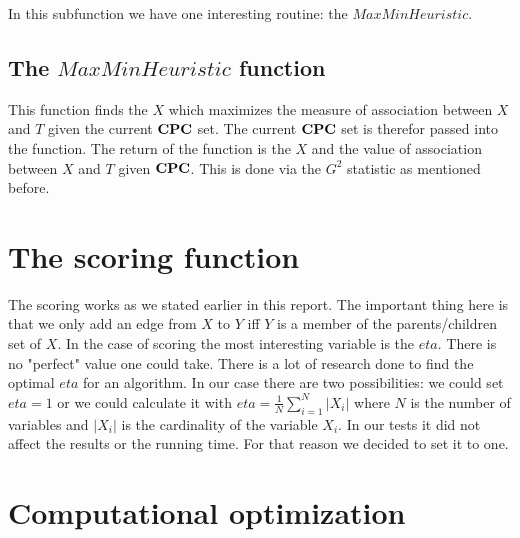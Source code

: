 			 \label{img.mmpcBar}

			In this subfunction we have one interesting routine: the $MaxMinHeuristic$.

			\subsection{The $MaxMinHeuristic$ function}

				This function finds the $X$ which maximizes the measure of association between $X$ and $T$ given the current ${\textbf{CPC}}$ set. The current ${\textbf{CPC}}$ set is therefor passed into the function. The return of the function is the $X$ and the value of association between $X$ and $T$ given ${\textbf{CPC}}$. This is done via the $G^{2}$ statistic as mentioned before.

		\section{The scoring function}

			The scoring works as we stated earlier in this report. The important thing here is that we only add an edge from $X$ to $Y$ iff $Y$ is a member of the parents/children set of $X$. In the case of scoring the most interesting variable is the $eta$. There is no "perfect" value one could take. There is a lot of research done to find the optimal $eta$ for an algorithm. In our case there are two possibilities: we could set $eta = 1$ or we could calculate it with $eta = \frac{1}{N} \sum_{i = 1}^{N} |X_{i}|$ where $N$ is the number of variables and $|X_{i}|$ is the cardinality of the variable $X_{i}$. In our tests it did not affect the results or the running time. For that reason we decided to set it to one.
			

	\section{Computational optimization}

